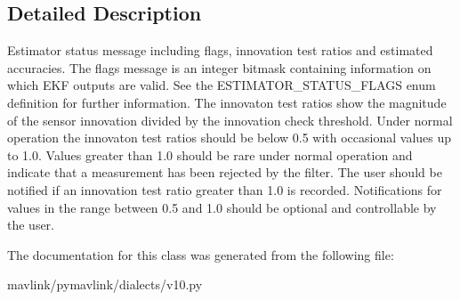 \subsection{Detailed Description}
\begin{DoxyVerb}Estimator status message including flags, innovation test
ratios and estimated accuracies. The flags message is an
integer bitmask containing information on which EKF outputs
are valid. See the ESTIMATOR_STATUS_FLAGS enum definition for
further information. The innovaton test ratios show the
magnitude of the sensor innovation divided by the innovation
check threshold. Under normal operation the innovaton test
ratios should be below 0.5 with occasional values up to 1.0.
Values greater than 1.0 should be rare under normal operation
and indicate that a measurement has been rejected by the
filter. The user should be notified if an innovation test
ratio greater than 1.0 is recorded. Notifications for values
in the range between 0.5 and 1.0 should be optional and
controllable by the user.
\end{DoxyVerb}
 

The documentation for this class was generated from the following file\+:\begin{DoxyCompactItemize}
\item 
mavlink/pymavlink/dialects/v10.\+py\end{DoxyCompactItemize}
